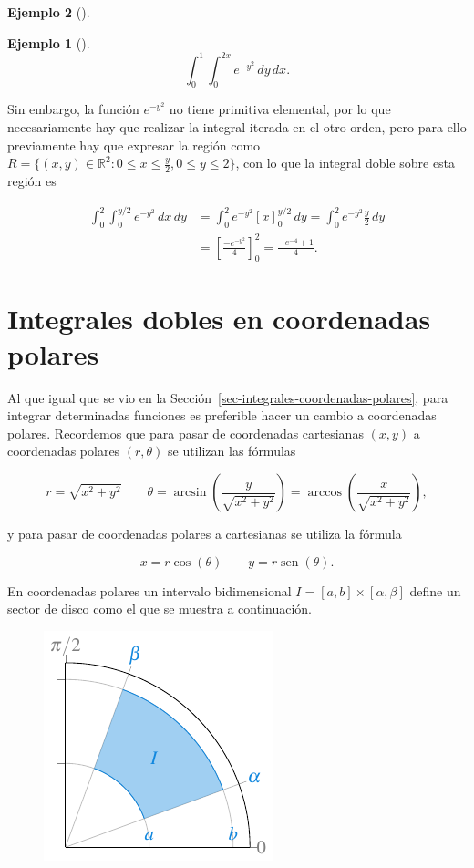 \documentclass[
  a4paper,
]{scrreport}
\theoremstyle{definition}
\newtheorem{example}{Ejemplo}[chapter]
\theoremstyle{plain}
\theoremstyle{definition}
\theoremstyle{definition}
\theoremstyle{plain}
\theoremstyle{plain}
\theoremstyle{remark}
\begin{document}
\begin{example}[]
\begin{example}[]
\[
\int_0^1\int_0^{2x} e^{-y^2}\,dy\,dx.
\]

Sin embargo, la función \(e^{-y^2}\) no tiene primitiva elemental, por
lo que necesariamente hay que realizar la integral iterada en el otro
orden, pero para ello previamente hay que expresar la región como
\(R=\{(x,y)\in \mathbb{R}^2: 0\leq x\leq \frac{y}{2}, 0\leq y\leq 2\}\),
con lo que la integral doble sobre esta región es

\begin{align*}
\int_0^2\int_0^{y/2} e^{-y^2}\,dx\,dy 
&= \int_0^2 e^{-y^2}[x]_0^{y/2}\,dy 
= \int_0^2 e^{-y^2}\frac{y}{2}\,dy \\
&= \left[\frac{-e^{-y^2}}{4}\right]_0^2
= \frac{-e^{-4}+1}{4}.
\end{align*}

\end{example}

\section{Integrales dobles en coordenadas
polares}\label{integrales-dobles-en-coordenadas-polares}

Al que igual que se vio en la
Sección~\ref{sec-integrales-coordenadas-polares}, para integrar
determinadas funciones es preferible hacer un cambio a coordenadas
polares. Recordemos que para pasar de coordenadas cartesianas \((x,y)\)
a coordenadas polares \((r,\theta)\) se utilizan las fórmulas

\[
r = \sqrt{x^2 + y^2} \qquad \theta = \operatorname{arcsin}\left(\frac{y}{\sqrt{x^2+y^2}}\right) = \operatorname{arccos}\left(\frac{x}{\sqrt{x^2+y^2}}\right),
\]

y para pasar de coordenadas polares a cartesianas se utiliza la fórmula

\[
x = r\cos(\theta) \qquad y = r\operatorname{sen}(\theta).
\]

En coordenadas polares un intervalo bidimensional
\(I=[a,b]\times[\alpha,\beta]\) define un sector de disco como el que se
muestra a continuación.

\begin{figure}[H]

{\centering \includegraphics{img/integrales-funciones-varias-variables/intervalo-bidimensional-polar.pdf}

}
\end{figure}
\end{example}
\end{document}

